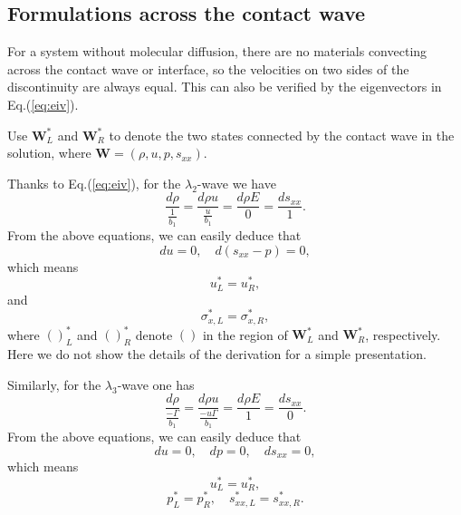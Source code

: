 \documentclass[review]{elsarticle}
\begin{document}
\subsection{Formulations across the  contact wave}
  For  a  system without molecular diffusion, there are  no materials convecting  across the contact wave or interface, so the velocities on two sides of  the discontinuity are always equal. %
  This can also be verified by the eigenvectors  in Eq.(\ref{eq:eiv}).

Use $\mathbf{W}_L^*$ and $\mathbf{W}_R^*$ to denote the two states connected by the contact wave in the solution, where $\mathbf{W}=\left(\rho,u,p,s_{xx}\right)$.

Thanks to Eq.(\ref{eq:eiv}), for the $\lambda_{2}$-wave we
have
\begin{equation}   \label{e23a}
\frac{d \rho}{\frac{1}{b_{1}}} = \frac{d \rho u}{\frac{u
}{b_{1}}}=\frac{d \rho E}{0} = \frac{d s_{xx}}{1}.
\end{equation}
From the above equations, we can easily deduce that
\begin{equation}   \label{e23b}
du = 0, \quad d(s_{xx}-p)=0,
\end{equation}
 which means
\begin{equation}   \label{e23c}
  u_{L}^{\ast}=u_{R}^{\ast},
\end{equation}
and
\begin{equation}   \label{e23d}
\sigma_{x,L}^{\ast}=\sigma_{x,R}^{\ast},
\end{equation}
where $()_{L}^{\ast}$ and $()_{R}^{\ast}$ denote $()$ in the region
of $\mathbf{W}_{L}^{\ast}$ and $\mathbf{W}_{R}^{\ast}$,
respectively. Here we do not show the details of the derivation for a simple
 presentation.


Similarly, for the $\lambda_{3}$-wave one
has
\begin{equation}   \label{e24a}
\frac{d \rho}{\frac{-\Gamma}{b_{1}}} = \frac{d \rho u}{\frac{-u
\Gamma}{b_{1}}}=\frac{d \rho E}{1} = \frac{d s_{xx}}{0}.
\end{equation}
From the above equations, we can easily deduce  that
\begin{equation}   \label{e24b}
du = 0, \quad dp=0, \quad ds_{xx}=0,
\end{equation}
 which means
\begin{equation}   \label{e24c}
  u_{L}^{\ast}=u_{R}^{\ast},
\end{equation}
\begin{equation}   \label{e24d}
p_{L}^{\ast}=p_{R}^{\ast}, \quad
  s_{xx,L}^{\ast}=s_{xx,R}^{\ast}.
\end{equation}
\end{document}
